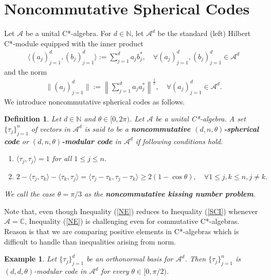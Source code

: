 \documentclass{amsart}
\newtheorem{definition}[theorem]{Definition}
\newtheorem{example}[theorem]{Example}
\begin{document}
 \section{Noncommutative Spherical Codes}
 Let $\mathcal{A}$ be a unital C*-algebra. For $d \in \mathbb{N}$, let $\mathcal{A}^d$ be the standard (left) Hilbert C*-module  \cite{WEGGEOLSEN}  equipped with the inner product 
 \begin{align*}
 	\langle (a_j)_{j=1}^d,(b_j)_{j=1}^d\rangle := \sum_{j=1}^da_jb^*_j,  \quad \forall (a_j)_{j=1}^d,(b_j)_{j=1}^d \in \mathcal{A}^d
 \end{align*}
 and the norm 
 \begin{align*}
 	\|(a_j)_{j=1}^d\|:= \left\| \sum_{j=1}^da_ja^*_j\right\|^\frac{1}{2}, \quad \forall (a_j)_{j=1}^d\in 	\mathcal{A}^d.
 \end{align*}
We introduce noncommutative spherical codes  as follows. 
\begin{definition}\label{PCODEDEFINITION}
	Let $d\in \mathbb{N}$ and $\theta \in [0, 2 \pi)$. Let $\mathcal{A}$ be a unital C*-algebra. A set $\{\tau_j\}_{j=1}^n$  of vectors  in $ \mathcal{A}^d$	is said to be a \textbf{noncommutative $(d,n,\theta)$-spherical code} or  \textbf{$(d,n,\theta)$-modular code} in $\mathcal{A}^d$ if following conditions hold.
	\begin{enumerate}[\upshape(i)]
		\item $	\langle \tau_j, \tau_j\rangle=1$ for all  $1\leq j \leq n$.
		\item  
		\begin{equation}\label{NE}
		2-\langle \tau_j, \tau_k \rangle -\langle \tau_k, \tau_j \rangle=\langle \tau_j-\tau_k,  \tau_j-\tau_k\rangle\geq 2(1-\cos \theta), \quad  \forall 1\leq j, k \leq n, j \neq k.
		\end{equation}
		\end{enumerate}
		We call the  case $\theta=\pi/3$  as the \textbf{noncommutative kissing number problem}.
\end{definition}
Note that, even though Inequality (\ref{NE}) reduces to Inequality (\ref{SCI}) whenever $\mathcal{A}=\mathbb{C}$, Inequality (\ref{NE}) is challenging even for commutative C*-algebras. Reason is that we are comparing positive elements in C*-algebras which is difficult to handle than inequalities arising from norm.
\begin{example}
	Let $\{\tau_j\}_{j=1}^d$ be an orthonormal basis for $\mathcal{A}^d$. Then $\{\tau_j\}_{j=1}^n$ is $(d,d,\theta)$-modular code in $\mathcal{A}^d$ for every $ \theta \in [0, \pi/2)$. 
\end{example}
\end{document}
